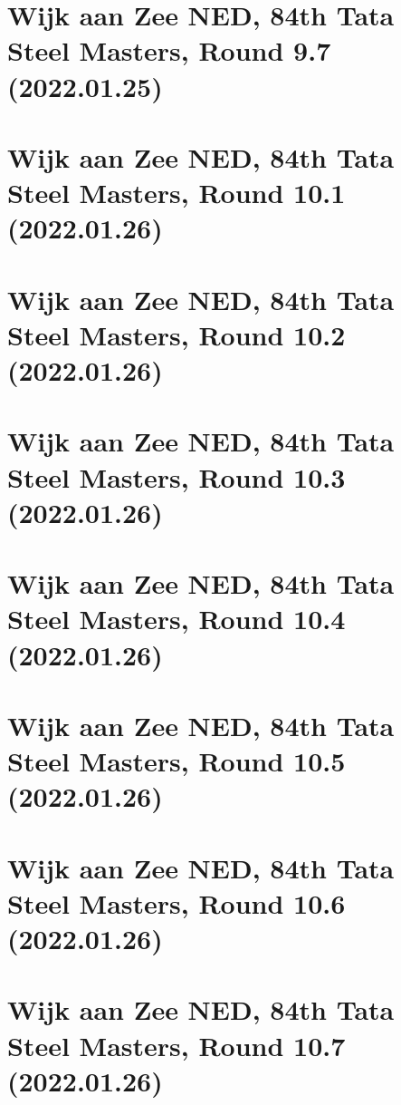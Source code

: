 \documentclass[11pt]{article}
\newcommand*\cleartoleftpage{%
   \clearpage
   \ifodd\value{page}\hbox{}\newpage\fi
}
\begin{document}
\cleartoleftpage

\section{Wijk aan Zee NED, 84th Tata Steel Masters, Round 9.7 (2022.01.25)}


\cleartoleftpage

\section{Wijk aan Zee NED, 84th Tata Steel Masters, Round 10.1 (2022.01.26)}


\cleartoleftpage

\section{Wijk aan Zee NED, 84th Tata Steel Masters, Round 10.2 (2022.01.26)}


\cleartoleftpage

\section{Wijk aan Zee NED, 84th Tata Steel Masters, Round 10.3 (2022.01.26)}


\cleartoleftpage

\section{Wijk aan Zee NED, 84th Tata Steel Masters, Round 10.4 (2022.01.26)}


\cleartoleftpage

\section{Wijk aan Zee NED, 84th Tata Steel Masters, Round 10.5 (2022.01.26)}


\cleartoleftpage

\section{Wijk aan Zee NED, 84th Tata Steel Masters, Round 10.6 (2022.01.26)}


\cleartoleftpage

\section{Wijk aan Zee NED, 84th Tata Steel Masters, Round 10.7 (2022.01.26)}

\end{document}
